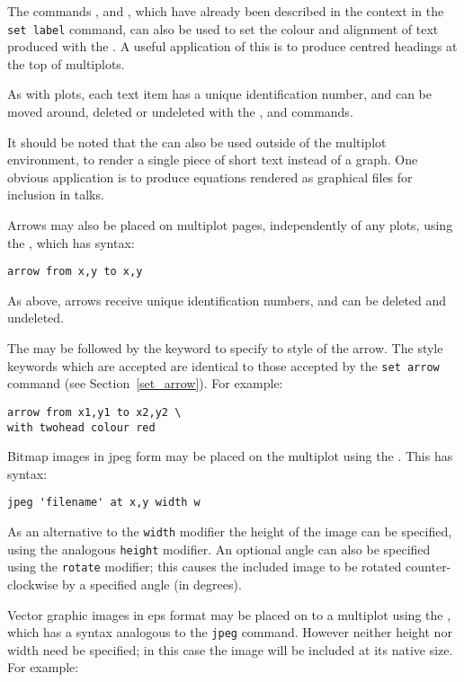 The commands ,  and
, which have already been described in the context in
the {\tt set label} command, can also be used to set the colour and alignment
of text produced with the .  A useful application of this is to
produce centred headings at the top of multiplots.

As with plots, each text item has a unique identification number, and can be
moved around, deleted or undeleted with the ,
 and  commands.

It should be noted that the  can also be used outside of the
multiplot environment, to render a single piece of short text instead of a
graph. One obvious application is to produce equations rendered as graphical
files for inclusion in talks.

\label{arrows} Arrows may also be placed on multiplot pages, independently of
any plots, using the , which has syntax:

\begin{verbatim} 
arrow from x,y to x,y
\end{verbatim}

As above, arrows receive unique identification numbers, and can be deleted and
undeleted.

The  may be followed by the  keyword to specify to
style of the arrow. The style keywords which are accepted are identical to
those accepted by the {\tt set arrow} command (see Section~\ref{set_arrow}).
For example:

\begin{verbatim} 
arrow from x1,y1 to x2,y2 \
with twohead colour red
\end{verbatim}

Bitmap images in jpeg form may be placed on the multiplot using the
\indcmdt{jpeg}.  This has syntax:

\begin{verbatim}
jpeg 'filename' at x,y width w
\end{verbatim}

As an alternative to the {\tt width} modifier the height of the image can be
specified, using the analogous {\tt height} modifier.  An optional angle can
also be specified using the {\tt rotate} modifier; this causes the included
image to be rotated counter-clockwise by a specified angle (in degrees).

Vector graphic images in eps format may be placed on to a multiplot using the
\indcmdt{eps}, which has a syntax analogous to the {\tt jpeg} command.  However
neither height nor width need be specified; in this case the image will be
included at its native size.  For example:


